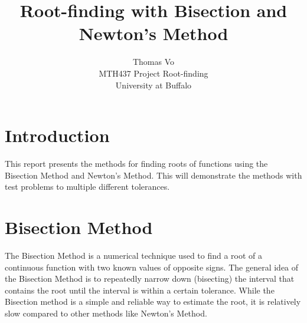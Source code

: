 \documentclass[9pt]{extarticle}
\begin{document}
\title{Root-finding with Bisection and Newton's Method}

\author{Thomas Vo \\ MTH437 Project Root-finding\\ University at Buffalo}
\maketitle

\section*{Introduction}
This report presents the methods for finding roots of functions using the Bisection Method and Newton's Method. This will demonstrate the methods with test problems to multiple different tolerances. 

\section{Bisection Method}

The Bisection Method is a numerical technique used to find a root of a continuous function with two known values of opposite signs. The general idea of the Bisection Method is to repeatedly narrow down (bisecting) the interval that contains the root until the interval is within a certain tolerance. While the Bisection method is a simple and reliable way to estimate the root, it is relatively slow compared to other methods like Newton's Method.
\end{document}
